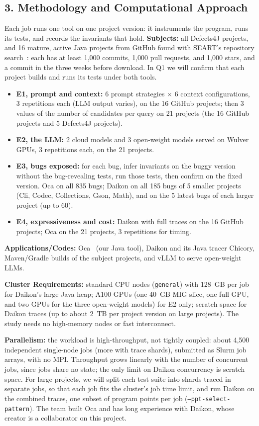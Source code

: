 \documentclass{article}
\begin{document}
\subsection*{3. Methodology and Computational Approach}
Each job runs one tool on one project version: it instruments the program, runs its tests, and records the invariants that hold.
\textbf{Subjects:} all Defects4J projects, and 16 mature, active Java projects from GitHub found with SEART's repository search~\cite{DabicAB2021}: each has at least 1,000 commits, 1,000 pull requests, and 1,000 stars, and a commit in the three weeks before download.
In Q1 we will confirm that each project builds and runs its tests under both tools.
\begin{itemize}
\item \textbf{E1, prompt and context:} 6 prompt strategies $\times$ 6 context configurations, 3 repetitions each (LLM output varies), on the 16 GitHub projects; then 3 values of the number of candidates per query on 21 projects (the 16 GitHub projects and 5 Defects4J projects).
\item \textbf{E2, the LLM:} 2 cloud models and 3 open-weight models served on Wulver GPUs, 3 repetitions each, on the 21 projects.
\item \textbf{E3, bugs exposed:} for each bug, infer invariants on the buggy version without the bug-revealing tests, run those tests, then confirm on the fixed version.
    Oca on all 835 bugs; Daikon on all 185 bugs of 5 smaller projects (Cli, Codec, Collections, Gson, Math), and on the 5 latest bugs of each larger project (up to 60).
\item \textbf{E4, expressiveness and cost:} Daikon with full traces on the 16 GitHub projects; Oca on the 21 projects, 3 repetitions for timing.
\end{itemize}
\textbf{Applications/Codes:} Oca~\cite{Oca} (our Java tool), Daikon and its Java tracer Chicory, Maven/Gradle builds of the subject projects, and vLLM to serve open-weight LLMs.

\textbf{Cluster Requirements:} standard CPU nodes (\texttt{general}) with 128~GB per job for Daikon's large Java heap; A100 GPUs (one 40~GB MIG slice, one full GPU, and two GPUs for the three open-weight models) for E2 only; scratch space for Daikon traces (up to about 2~TB per project version on large projects).
The study needs no high-memory nodes or fast interconnect.

\textbf{Parallelism:} the workload is high-throughput, not tightly coupled: about 4,500 independent single-node jobs (more with trace shards), submitted as Slurm job arrays, with no MPI.
Throughput grows linearly with the number of concurrent jobs, since jobs share no state; the only limit on Daikon concurrency is scratch space.
For large projects, we will split each test suite into shards traced in separate jobs, so that each job fits the cluster's job time limit, and run Daikon on the combined traces, one subset of program points per job (\texttt{--ppt-select-pattern}).
The team built Oca and has long experience with Daikon, whose creator is a collaborator on this project.
\end{document}
